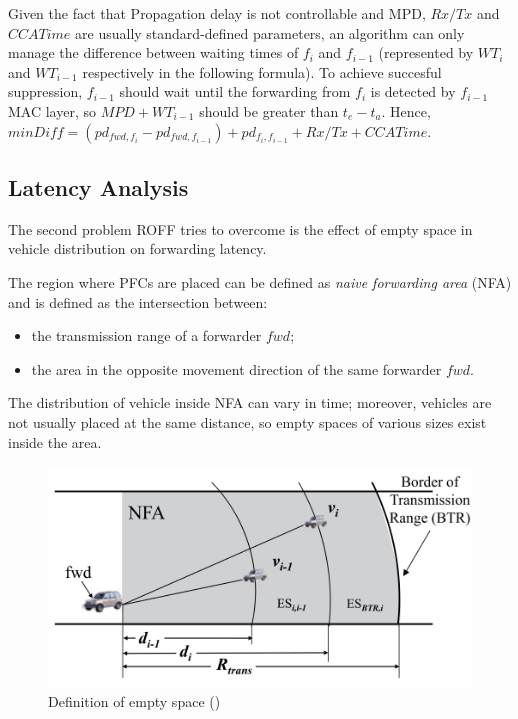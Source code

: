 			
			Given the fact that Propagation delay is not controllable and MPD, $Rx/Tx$ and $CCATime$ are usually standard-defined parameters, an algorithm can only manage the difference between waiting times of $f_i$ and $f_{i-1}$ (represented by $WT_i$ and $WT_{i-1}$ respectively in the following formula).
			To achieve succesful suppression, $f_{i-1}$ should wait until the forwarding from $f_i$ is detected by $f_{i-1}$ MAC layer, so $MPD+WT_{i-1}$ should be greater than $t_e - t_a$. Hence, $minDiff = (pd_{fwd, f_i} - pd_{fwd, f_{i-1}}) + pd_{f_i, f_{i-1}} + Rx/Tx + CCATime$.
		
		\subsection{Latency Analysis}
			\label{ssec:latency-analysis}
			The second problem ROFF tries to overcome is the effect of empty space in vehicle distribution on forwarding latency.
			
			The region where PFCs are placed can be defined as \textit{naive forwarding area} (NFA) and is defined as the intersection between:
			\begin{itemize}
				\item the transmission range of a forwarder $fwd$;
				\item the area in the opposite movement direction of the same forwarder $fwd$.
			\end{itemize}
			The distribution of vehicle inside NFA can vary in time; moreover, vehicles are not usually placed at the same distance, so empty spaces of various sizes exist inside the area.
			
			\begin{figure}[H]
				\centering
				\includegraphics[width=\textwidth]{immagini/emptySpace}
				\caption{Definition of empty space (\cite{6906275})}
				\label{fig:emptySpace}
			\end{figure}
			

